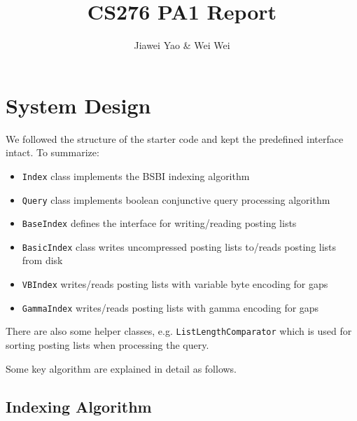 \documentclass{article}
\begin{document}
\title{CS276 PA1 Report}

\author{Jiawei Yao \& Wei Wei}

\maketitle

\section{System Design}

We followed the structure of the starter code and kept the predefined
interface intact. To summarize:
\begin{itemize}
  \item \texttt{Index} class implements the BSBI indexing algorithm
  
  \item \texttt{Query} class implements boolean conjunctive query
  processing algorithm
  
  \item \texttt{BaseIndex} defines the interface for writing/reading
  posting lists
  
  \item \texttt{BasicIndex} class writes uncompressed posting lists
  to/reads posting lists from disk
  
  \item \texttt{VBIndex} writes/reads posting lists with variable byte
  encoding for gaps
  
  \item \texttt{GammaIndex} writes/reads posting lists with gamma encoding
  for gaps
\end{itemize}
There are also some helper classes, e.g. \texttt{ListLengthComparator}
which is used for sorting posting lists when processing the query.

Some key algorithm are explained in detail as follows.

\subsection{Indexing Algorithm}
\end{document}

